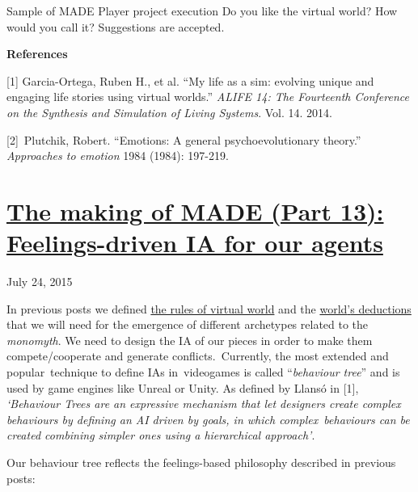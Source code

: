 \documentclass[a4paper]{article}
\newcommand\textstyleStrongEmphasis[1]{\textbf{#1}}
\newcommand\textstyleEmphasis[1]{\textit{#1}}
\begin{document}
Sample of MADE Player project execution
Do you like the virtual world? How would you call it? Suggestions are
accepted.

\textstyleStrongEmphasis{References}

[1] Garcia-Ortega, Ruben H., et al. {\textquotedblleft}My life as a sim:
evolving unique and engaging life stories using virtual
worlds.{\textquotedblright} \textit{ALIFE 14: The Fourteenth Conference
on the Synthesis and Simulation of Living Systems}. Vol. 14. 2014.

[2]~Plutchik, Robert. {\textquotedblleft}Emotions: A general
psychoevolutionary theory.{\textquotedblright} \textit{Approaches to
emotion} 1984 (1984): 197-219.


\bigskip

\clearpage\section[The making of MADE (Part 13): Feelings{}-driven IA
for our
agents]{\href{http://www.velonuboso.com/made/2015/07/24/making-part-13-feelings-driven-ia-agents/}{The
making of MADE (Part 13): Feelings-driven IA for our agents}}
July 24, 2015

In previous posts we defined
\href{http://www.velonuboso.com/made/2015/07/18/making-part-12-simple-powerful-virtual-world/}{the
rules of virtual world} and the
\href{http://www.velonuboso.com/made/2015/07/18/making-part-11-predicate-dependency-graph-archetypes/}{world{\textquoteright}s
deductions} that we will need for the emergence of different archetypes
related to the \textstyleEmphasis{monomyth}. We need to design the IA
of our pieces in order to make them compete/cooperate and generate
conflicts.~Currently, the most extended and popular~technique to define
IAs in~videogames is called
{\textquotedblleft}\textstyleEmphasis{behaviour
tree}{\textquotedblright} and is used by game engines like Unreal or
Unity. As defined by Llans\'o in [1],
\textstyleEmphasis{{\textquoteleft}Behaviour Trees are an expressive
mechanism that let designers create complex behaviours by defining an
AI driven by goals, in which complex~behaviours can be created
combining simpler ones using a hierarchical approach{\textquoteright}}.

Our behaviour tree reflects the feelings-based philosophy described in
previous posts:
\end{document}
